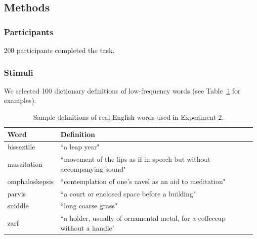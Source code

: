 \subsection{Methods}

\subsubsection{Participants} 
200 participants completed the task.

\subsubsection{Stimuli} 
We selected 100 dictionary definitions of low-frequency words (see Table~\ref{tab:sample_word_defs} for examples). 

\begin{table}[t!]
\centering

\begin{tabular}{ll}
\toprule
\textbf{Word} & \textbf{Definition}                \\
\toprule
   bissextile & ``a leap year"\\
   mussitation  &  \multicolumn{1}{p{12cm}}{ ``movement of the lips as if in speech but without accompanying sound"}    \\
   omphaloskepsis  &  \multicolumn{1}{p{12cm}}{ ``contemplation of one's navel as an aid to meditation"}                  \\
   parvis    &  \multicolumn{1}{p{12cm}}{ ``a court or enclosed space before a building"}                               \\
   sniddle      &  \multicolumn{1}{p{12cm}}{ ``long coarse grass"}     \\
   zarf     & \multicolumn{1}{p{12cm}}{ ``a holder, usually of ornamental metal, for a coffeecup without a handle"}                                 \\

 \bottomrule
\end{tabular}
\caption{Sample definitions of real English words used in Experiment 2.}
\label{tab:sample_word_defs}
\end{table}



